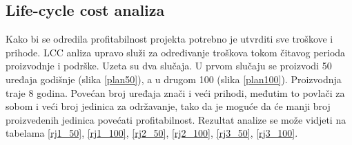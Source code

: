 \documentclass[12pt]{article}
\begin{document}
\subsection{Life-cycle cost analiza}
Kako bi se odredila profitabilnost projekta potrebno je utvrditi sve troškove i prihode. LCC anliza upravo služi za određivanje troškova tokom čitavog perioda proizvodnje i podrške. Uzeta su dva slučaja. U prvom slučaju se proizvodi 50 uređaja godišnje (slika \ref{plan50}), a u drugom 100 (slika \ref{plan100}). Proizvodnja traje 8 godina. Povećan broj uređaja znači i veći prihodi, međutim to povlači za sobom i veći broj jedinica za održavanje, tako da je moguće da će manji broj proizvedenih jedinica povećati profitabilnost. Rezultat analize se može vidjeti na tabelama \ref{rj1_50}, \ref{rj1_100}, \ref{rj2_50}, \ref{rj2_100}, \ref{rj3_50}, \ref{rj3_100}.
\end{document}
